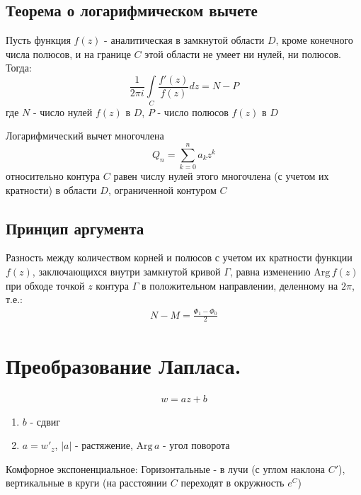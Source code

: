 \documentclass[12pt]{extarticle}
\newcommand{\Arg}{\mathrm{Arg}\,}
\begin{document}
\subsection{Теорема о логарифмическом вычете}
Пусть функция $f(z)$ - аналитическая в замкнутой области $D$, кроме
конечного числа полюсов, и на границе $C$ этой области не умеет ни
нулей, ни полюсов. Тогда:
\begin{displaymath}
    \frac{1}{2\pi i}\int\limits_{C}\frac{f'(z)}{f(z)}dz=N-P
\end{displaymath}
где $N$ - число нулей $f(z)$ в $D$, $P$ - число полюсов $f(z)$ в $D$
\par Логарифмический вычет многочлена
\begin{displaymath}
    Q_{n}=\sum\limits_{k=0}^{n}a_{k}z^{k}
\end{displaymath}
относительно контура $C$ равен числу нулей этого многочлена (с учетом их
кратности) в области $D$, ограниченной контуром $C$

\subsection{Принцип аргумента}
Разность между количеством корней и полюсов с учетом их кратности
функции $f(z)$, заключающихся внутри замкнутой кривой $\Gamma$, равна
изменению $\Arg f(z)$ при обходе точкой $z$ контура $\Gamma$ в
положительном направлении, деленному на $2\pi$, т.е.:
\begin{eqnarray*}
    N-M=\frac{\Phi_{1}-\Phi_{0}}{2}
\end{eqnarray*}



\section{Преобразование Лапласа.}

\begin{eqnarray*}
w=az+b
\end{eqnarray*}

\begin{enumerate}
    \itemsep0em
    \item $b$ - сдвиг
    \item $a=w'_{z}$, $|a|$ - растяжение, $\Arg a$ - угол поворота
\end{enumerate}

\par Комфорное экспоненциальное:
Горизонтальные - в лучи (с углом наклона $C'$), вертикальные в круги (на
расстоянии $C$ переходят в окружность $e^{C}$)
\end{document}
